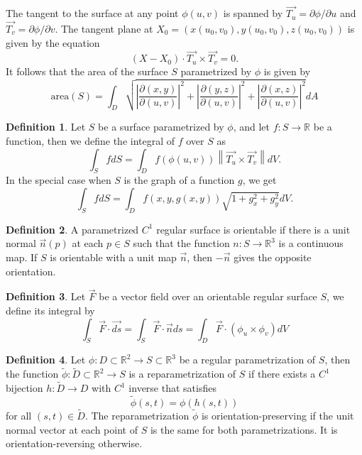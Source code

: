 \documentclass{article}
\theoremstyle{plain}
\theoremstyle{definition}
\newtheorem*{definition}{Definition}
\newcommand{\R}{\mathbb{R}}
\newcommand{\norm}[1]{\left\lVert#1 \right\rVert}
\begin{document}
The tangent to the surface at any point $\phi(u,v)$ is spanned by $\vec{T_u} = \partial \phi / \partial u$ and $\vec{T_v} = \partial \phi / \partial v$. The tangent plane at $X_0 = (x(u_0, v_0), y(u_0, v_0), z(u_0, v_0))$ is given by the equation
$$(X - X_0)\cdot \vec{T_u}\times \vec{T_v} = 0.$$
It follows that the area of the surface $S$ parametrized by $\phi$ is given by
$$\text{area}(S) = \int_D \sqrt{\left|\frac{\partial(x,y)}{\partial(u,v)}\right|^2 + \left|\frac{\partial(y,z)}{\partial(u,v)}\right|^2 + \left|\frac{\partial(x,z)}{\partial(u,v)}\right|^2}dA$$

\begin{definition}
    Let $S$ be a surface parametrized by $\phi$, and let $f : S \to \R$ be a function, then we define the integral of $f$ over $S$ as
    $$\int_SfdS = \int_Df(\phi(u,v))\norm{\vec{T_u} \times \vec{T_v}}dV.$$ In the special case when $S$ is the graph of a function $g$, we get
    $$\int_SfdS = \int_Df(x,y,g(x,y))\sqrt{1 + g_x^2 + g_y^2}dV.$$
\end{definition}

\begin{definition}
    A parametrized $C^1$ regular surface is orientable if there is a unit normal $\vec{n}(p)$ at each $p \in S$ such that the function $n : S \to \R^3$ is a continuous map. If $S$ is orientable with a unit map $\vec{n}$, then $-\vec{n}$ gives the opposite orientation.
\end{definition}

\begin{definition}
    Let $\vec{F}$ be a vector field over an orientable regular surface $S$, we define its integral by
    $$\int_S \vec{F}\cdot \vec{ds} = \int_S \vec{F}\cdot \vec{n} ds = \int_D \vec{F}\cdot(\phi_u \times \phi_v)dV$$
\end{definition}

\begin{definition}
    Let $\phi : D \subset \R^2 \to S \subset \R^3$ be a regular parametrization of $S$, then the function $\tilde\phi : \tilde{D} \subset \R^2 \to S$ is a reparametrization of $S$ if there exists a $C^1$ bijection $h : \tilde{D} \to D$ with $C^1$ inverse that satisfies
    $$\tilde\phi(s,t) = \phi(h(s,t))$$
    for all $(s,t) \in \tilde{D}$. The reparametrization $\tilde\phi$ is orientation-preserving if the unit normal vector at each point of $S$ is the same for both parametrizations. It is orientation-reversing otherwise.
\end{definition}
\end{document}
